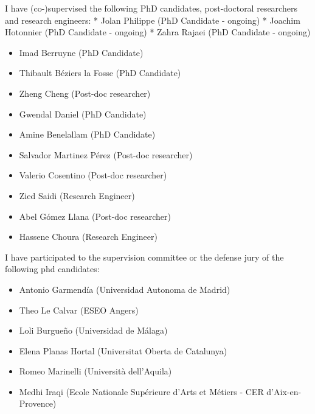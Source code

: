 I have (co-)supervised the following PhD candidates, post-doctoral
researchers and research engineers: * Jolan Philippe (PhD Candidate -
ongoing) * Joachim Hotonnier (PhD Candidate - ongoing) * Zahra Rajaei
(PhD Candidate - ongoing)

\begin{itemize}
\tightlist
\item
  Imad Berruyne (PhD Candidate)
\item
  Thibault Béziers la Fosse (PhD Candidate)
\item
  Zheng Cheng (Post-doc researcher)
\item
  Gwendal Daniel (PhD Candidate)
\item
  Amine Benelallam (PhD Candidate)
\item
  Salvador Martinez Pérez (Post-doc researcher)
\item
  Valerio Cosentino (Post-doc researcher)
\item
  Zied Saidi (Research Engineer)
\item
  Abel Gómez Llana (Post-doc researcher)
\item
  Hassene Choura (Research Engineer)
\end{itemize}

I have participated to the supervision committee or the defense jury of
the following phd candidates:

\begin{itemize}
\tightlist
\item
  Antonio Garmendía (Universidad Autonoma de Madrid)
\item
  Theo Le Calvar (ESEO Angers)
\item
  Loli Burgueño (Universidad de Málaga)
\item
  Elena Planas Hortal (Universitat Oberta de Catalunya)
\item
  Romeo Marinelli (Università dell'Aquila)
\item
  Medhi Iraqi (Ecole Nationale Supérieure d'Arts et Métiers - CER
  d'Aix-en-Provence)
\end{itemize}
